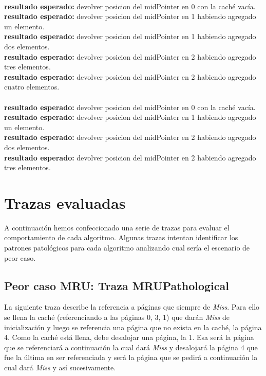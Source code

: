 \documentclass[11pt, a4paper, spanish]{article}
\begin{document}
\\
\textbf{resultado esperado:} devolver posicion del midPointer en 0 con la cach\'e vac\'ia.\\
\textbf{resultado esperado:} devolver posicion del midPointer en 1 habiendo agregado un elemento.\\
\textbf{resultado esperado:} devolver posicion del midPointer en 1 habiendo agregado dos elementos.\\
\textbf{resultado esperado:} devolver posicion del midPointer en 2 habiendo agregado tres elementos.\\
\textbf{resultado esperado:} devolver posicion del midPointer en 2 habiendo agregado cuatro elementos.\\

\\
\textbf{resultado esperado:} devolver posicion del midPointer en 0 con la cach\'e vac\'ia.\\
\textbf{resultado esperado:} devolver posicion del midPointer en 1 habiendo agregado un elemento.\\
\textbf{resultado esperado:} devolver posicion del midPointer en 2 habiendo agregado dos elementos.\\
\textbf{resultado esperado:} devolver posicion del midPointer en 2 habiendo agregado tres elementos.\\


\newpage
\section{Trazas evaluadas}

A continuaci\'on hemos confeccionado una serie de trazas para evaluar el comportamiento de cada algoritmo. Algunas trazas intentan identificar
los patrones patol\'ogicos para cada algoritmo analizando cual ser\'ia el escenario de peor caso.

\subsection{ Peor caso MRU: Traza MRUPathological}


	La siguiente traza describe la referencia a p\'aginas que siempre de \textit{Miss}. Para ello se llena la cach\'e (referenciando a las 
p\'aginas 0, 3, 1) que dar\'an \textit{Miss} de inicializaci\'on y luego se referencia una p\'agina que no exista en la cach\'e, la p\'agina 4.
Como la cach\'e est\'a llena, debe desalojar una p\'agina, la 1. Esa ser\'a la p\'agina que se referenciar\'a a continuaci\'on la cual dar\'a \textit{Miss}
y desalojar\'a la p\'agina 4 que fue la \'ultima en ser referenciada y ser\'a la p\'agina que se pedir\'a a continuaci\'on la cual dar\'a \textit{Miss} y
as\'i sucesivamente.
\end{document}

